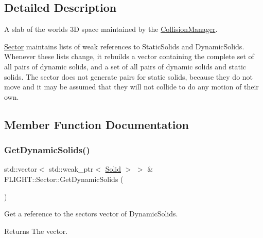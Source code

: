 \subsection{Detailed Description}
A slab of the world\textquotesingle{}s 3D space maintained by the \hyperlink{class_f_l_i_g_h_t_1_1_collision_manager}{Collision\+Manager}. 

\hyperlink{class_f_l_i_g_h_t_1_1_sector}{Sector} maintains lists of weak references to Static\+Solids and Dynamic\+Solids. Whenever these lists change, it rebuilds a vector containing the complete set of all pairs of dynamic solids, and a set of all pairs of dynamic solids and static solids. The sector does not generate pairs for static solids, because they do not move and it may be assumed that they will not collide to do any motion of their own. 

\subsection{Member Function Documentation}
\mbox{\label{class_f_l_i_g_h_t_1_1_sector_a1e1b11bd2a7d0c1bf8014c3df815f6cd}} 
\subsubsection{\texorpdfstring{Get\+Dynamic\+Solids()}{GetDynamicSolids()}}
{\footnotesize\ttfamily std\+::vector$<$ std\+::weak\+\_\+ptr$<$ \hyperlink{class_f_l_i_g_h_t_1_1_solid}{Solid} $>$ $>$ \& F\+L\+I\+G\+H\+T\+::\+Sector\+::\+Get\+Dynamic\+Solids (\begin{DoxyParamCaption}{ }\end{DoxyParamCaption})}



Get a reference to the sector\textquotesingle{}s vector of Dynamic\+Solids. 

\begin{DoxyReturn}{Returns}
The vector. 
\end{DoxyReturn}
\mbox{\label{class_f_l_i_g_h_t_1_1_sector_a4147f04e14046a915b9f944cc319473c}} 
